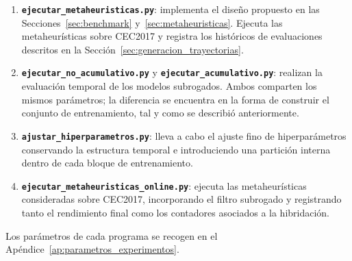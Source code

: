 \begin{enumerate}
    \item \textbf{\texttt{ejecutar\_metaheuristicas.py}}: implementa el diseño propuesto en las
          Secciones~\ref{sec:benchmark} y~\ref{sec:metaheuristicas}. Ejecuta las metaheurísticas
          sobre CEC2017 y registra los históricos de evaluaciones descritos en la
          Sección~\ref{sec:generacion_trayectorias}.
    \item \textbf{\texttt{ejecutar\_no\_acumulativo.py}} y \textbf{\texttt{ejecutar\_acumulativo.py}}:
          realizan la evaluación temporal de los modelos subrogados. Ambos comparten los mismos
          parámetros; la diferencia se encuentra en la forma de construir el conjunto de
          entrenamiento, tal y como se describió anteriormente.
    \item \textbf{\texttt{ajustar\_hiperparametros.py}}: lleva a cabo el ajuste fino de
          hiperparámetros conservando la estructura temporal
          e introduciendo una partición interna dentro de cada bloque de entrenamiento.
    \item \textbf{\texttt{ejecutar\_metaheuristicas\_online.py}}: ejecuta las metaheurísticas consideradas sobre CEC2017, incorporando el filtro subrogado y registrando tanto el rendimiento final como los contadores asociados a la hibridación.
\end{enumerate}

Los parámetros de cada programa se recogen en el Apéndice~\ref{ap:parametros_experimentos}.
